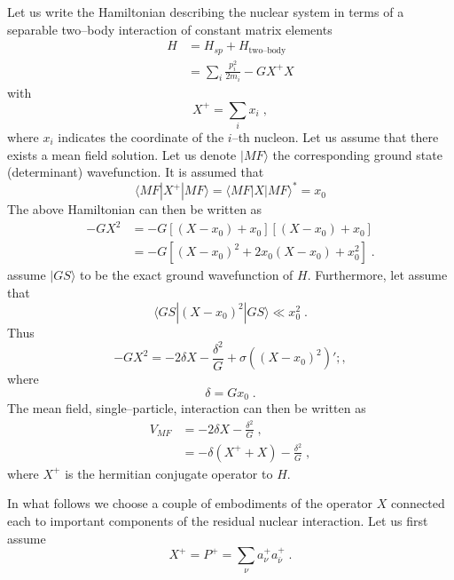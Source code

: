 \documentclass[a4paper,onecolumn,superscriptaddress,12pt,nofootinbib,twoside,raggedfooter,notitlepage]{revtex4-1}
\begin{document}
Let us write the Hamiltonian describing the nuclear system in terms of a separable two--body interaction of constant matrix elements
\begin{align}\label{eqn:e.1}
	H &= H_{sp} + H_\textrm{two--body} \\ \nonumber
	  &= \sum_i \frac{p_i^2}{2 m_i} - G X^+ X 
\end{align}
with 
\begin{equation}
	X^+ = \sum_i x_i \;, 
	\label{eqn:e.2}
\end{equation}
where $x_i$ indicates the coordinate of the $i$--th nucleon. Let us assume that there exists a mean field solution. Let us denote $| MF \rangle$ the corresponding ground state (determinant) wavefunction. It is assumed that
\begin{equation}
	\langle MF|X^+|MF \rangle = \langle MF|X|MF \rangle^* = x_0
	\label{eqn:e.3}
\end{equation}
The above Hamiltonian can then be written as
\begin{align} \label{eqn:e.4}
	-GX^2 &= -G \left[ (X - x_0) + x_0 \right] \left[ (X - x_0) + x_0 \right] \\ \nonumber
		  &= -G \left[ (X - x_0)^2 + 2 x_0 (X - x_0) + x_0^2 \right] \;. 
\end{align}
assume $|GS\rangle$ to be the exact ground wavefunction of $H$. Furthermore, let assume that
\begin{equation}
	\langle GS|(X-x_0)^2|GS\rangle \ll x_0^2 \;.
	\label{eqn:e.5}
\end{equation}
Thus
\begin{equation}
	-GX^2 = -2 \delta X - \frac{\delta^2}{G} + \sigma \left( (X-x_0)^2 \right) ';,
	\label{eqn:e.6}
\end{equation}
where
\begin{equation}
	\delta = G x_0 \;.
	\label{eqn:e.7}
\end{equation}
The mean field, single--particle, interaction can then be written as
\begin{align}\label{eqn:e.8}
	V_{MF} &= -2 \delta X - \frac{\delta^2}{G} \;, \\ \nonumber
		   &= -\delta (X^+ + X) - \frac{\delta^2}{G} \;, 
\end{align}
where $X^+$ is the hermitian conjugate operator to $H$.

In what follows we choose a couple of embodiments of the operator $X$ connected each to important components of the residual nuclear interaction. Let us first assume
\begin{equation}
	X^+ = P^+ = \sum_\nu a_\nu^+ a_{\bar{\nu}}^+ \;.
	\label{eqn:e.9}
\end{equation}
\end{document}
